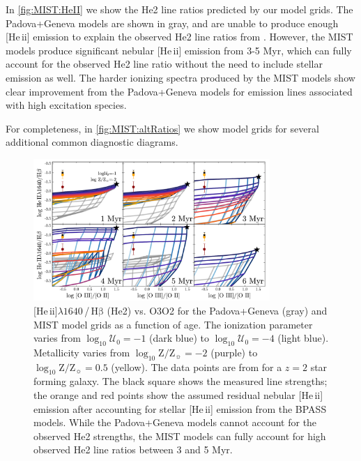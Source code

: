\documentclass[trackchanges, twocolumn, tighten]{aastex61}
\newcommand{\Fig}[1]{\autoref{fig:#1}}
\newcommand{\logten}{\ensuremath{\log_{10}}}
\newcommand{\heii}{[He\,{\sc ii}]\xspace}
\newcommand{\hb}{\ensuremath{\mathrm{H\beta}}}
\newcommand\lam[1]{\ensuremath{\lambda #1}}
\newcommand{\logZeq}[1]{\ensuremath{\logten \mathrm{Z}/\mathrm{Z}_{\sun} = #1}}
\newcommand{\logU}{\ensuremath{\logten \mathcal{U}_0}}
\begin{document}
In \Fig{MIST:HeII} we show the He2 line ratios predicted by our model grids. The Padova+Geneva models are shown in gray, and are unable to produce enough \heii emission to explain the observed He2 line ratios from \citet{Steidel16}. However, the MIST models produce significant nebular \heii emission from 3-5 Myr, which can fully account for the observed He2 line ratio without the need to include stellar emission as well. The harder ionizing spectra produced by the MIST models show clear improvement from the Padova+Geneva models for emission lines associated with high excitation species.

For completeness, in \Fig{MIST:altRatios} we show model grids for several additional common diagnostic diagrams. 
\begin{figure}
  \begin{centering}
    \includegraphics[width=0.8\textwidth]{f23.pdf}
    \caption{\heii\lam{1640}\,/\,\hb{} (He2) vs. O3O2 for the Padova+Geneva (gray) and MIST model grids as a function of age. The ionization parameter varies from $\logU{}=-1$ (dark blue) to $\logU{}=-4$ (light blue). Metallicity varies from \logZeq{-2} (purple) to \logZeq{0.5} (yellow). The data points are from \citet{Steidel16} for a $z=2$ star forming galaxy. The black square shows the measured line strengths; the orange and red points show the assumed residual nebular \heii{} emission after accounting for stellar \heii{} emission from the BPASS models. While the Padova+Geneva models cannot account for the observed He2 strengths, the MIST models can fully account for high observed He2 line ratios between 3 and 5 Myr.}
    \label{fig:MIST:HeII}
  \end{centering}
\end{figure}
\end{document}
